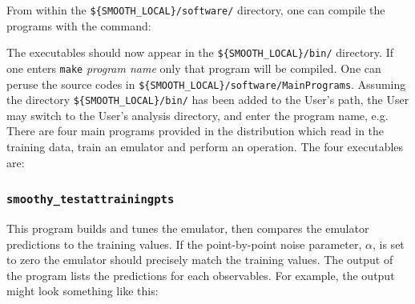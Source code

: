 \documentclass[UserManual.tex]{subfiles}
\begin{document}
\begin{sloppypar}
From within the {\tt \$\{SMOOTH\_LOCAL\}/software/} directory, one can compile the programs with the command:
\vspace*{-8pt}

The executables should now appear in the {\tt \$\{SMOOTH\_LOCAL\}/bin/} directory. If one enters {\tt make} {\it program name} only that program  will be compiled. One can peruse the source codes in {\tt \$\{SMOOTH\_LOCAL\}/software/MainPrograms}. Assuming the directory {\tt \$\{SMOOTH\_LOCAL\}/bin/} has been added to the User's path, the User may switch to the User's analysis directory, and enter the program name, e.g.
\vspace*{-8pt}
There are four main programs provided in the distribution which read in the training data, train an emulator and perform an operation. The four executables are:
\subsubsection{{\tt smoothy\_testattrainingpts}}
This program builds and tunes the emulator, then compares the emulator predictions to the training values. If the point-by-point noise parameter, $\alpha$, is set to zero the emulator should precisely match the training values. The output of the program lists the predictions for each observables. For example, the output might look something like this:
\vspace*{-8pt}{\tt \begin{Verbatim}[commandchars=\\\{\}]
% \textcolor{darkred}{smoothy_testattrainingpts}
 ------ first_observable_name -------------
 ---- Lambda=3.070954, SigmaA=93.242332
 - itrain --- Y_full     Y_emulator    Sigma_emulator
  0 Y[0]= 4.385e+01 =?  4.385e+01  +/-  2.41322e-05
  1 Y[0]= 9.320e+01 =?  9.320e+01  +/-  1.53834e-05
  2 Y[0]= 4.381e+01 =?  4.381e+01  +/-  2.57861e-05
  .
\end{Verbatim}
}\vspace*{-8pt}


\end{sloppypar}
\end{document}
